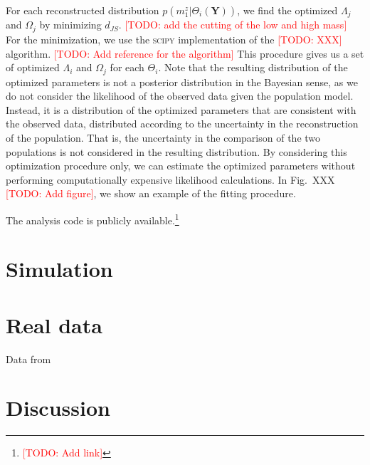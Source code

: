 \documentclass[aps,prd,twocolumn,superscriptaddress,preprintnumbers,nofootinbib,hidelinks]{revtex4-2}
\newcommand{\todo}[1]{\textcolor{red}{[TODO: #1]}}
\begin{document}
For each reconstructed distribution $p(m^z_1|\Theta_i(\mathbf{Y}))$, we find the optimized $\Lambda_j$ and $\Omega_j$ by minimizing $d_{JS}$.
\todo{add the cutting of the low and high mass}
For the minimization, we use the \textsc{scipy} \citep{2020SciPy-NMeth} implementation of the \todo{XXX} algorithm. \todo{Add reference for the algorithm}
This procedure gives us a set of optimized $\Lambda_i$ and $\Omega_j$ for each $\Theta_i$.
Note that the resulting distribution of the optimized parameters is not a posterior distribution in the Bayesian sense, as we do not consider the likelihood of the observed data given the population model.
Instead, it is a distribution of the optimized parameters that are consistent with the observed data, distributed according to the uncertainty in the reconstruction of the population.
That is, the uncertainty in the comparison of the two populations is not considered in the resulting distribution.
By considering this optimization procedure only, we can estimate the optimized parameters without performing computationally expensive likelihood calculations.
In Fig.~XXX \todo{Add figure}, we show an example of the fitting procedure.

The analysis code is publicly available.\footnote{\todo{Add link}}

\section{Simulation}
\label{sec:simulation}



\section{Real data}
\label{sec:real_data}

Data from \citet{LIGOScientific:2019lzm, KAGRA:2023pio}



\section{Discussion}
\label{sec:discussion}



\end{document}
